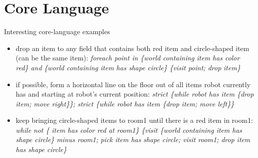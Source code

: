 \section{Core Language}
Interesting core-language examples

\begin{itemize}
	\item drop an item to any field that contains both red item and circle-shaped item (can be the same item): \textit{foreach point in \{world containing item has color red\} and \{world containing item has shape circle\} \{visit point; drop item\}}
	\item if possible, form a horizontal line on the floor out of all items robot currently has and starting at robot's current position: \textit{strict \{while robot has item \{drop item; move right\}\}; strict \{while robot has item \{drop item; move left\}\}}
	\item keep bringing circle-shaped items to room1 until there is a red item in room1: \textit{while not \{ item has color red at room1\} \{visit \{world containing item has shape circle\} minus room1; pick item has shape circle; visit room1; drop item has shape circle\}}

\end{itemize}